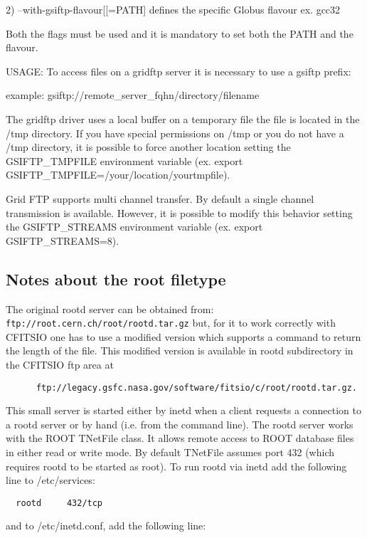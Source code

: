 \documentclass[11pt]{book}
\begin{document}
2)  --with-gsiftp-flavour[[=PATH] defines the specific Globus flavour
        ex. gcc32

Both the flags must be used and it is mandatory to set  both the PATH and the
flavour.

USAGE: To access files on a gridftp server it is necessary to use a gsiftp prefix:

example: gsiftp://remote\_server\_fqhn/directory/filename

The gridftp driver uses a local buffer on a temporary file the file is located
in the /tmp directory. If you have special permissions on /tmp or you do not have a /tmp
directory, it is possible to force another location setting the GSIFTP\_TMPFILE environment
variable (ex. export GSIFTP\_TMPFILE=/your/location/yourtmpfile).

Grid FTP supports multi channel transfer. By default a single channel transmission is
available. However, it is possible to modify this behavior setting the GSIFTP\_STREAMS
environment variable (ex. export GSIFTP\_STREAMS=8).


\subsection{Notes about the root filetype}

The original rootd server can be obtained from:
\verb-ftp://root.cern.ch/root/rootd.tar.gz-
but, for it to work correctly with CFITSIO one has to use a modified
version which supports a command to return the length of the file.
This modified version is available in rootd subdirectory
in the CFITSIO ftp area at

\begin{verbatim}
      ftp://legacy.gsfc.nasa.gov/software/fitsio/c/root/rootd.tar.gz.
\end{verbatim}

This small server is started either by inetd when a client requests a
connection to a rootd server or by hand (i.e. from the command line).
The rootd server works with the ROOT TNetFile class. It allows remote
access to ROOT database files in either read or write mode. By default
TNetFile assumes port 432 (which requires rootd to be started as root).
To run rootd via inetd add the following line to /etc/services:

\begin{verbatim}
  rootd     432/tcp
\end{verbatim}
and to /etc/inetd.conf, add the following line:
\end{document}
